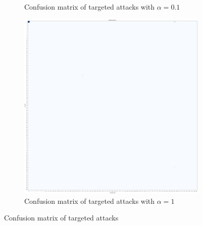 \begin{figure}[t]
\begin{subfigure}[b]{0.3\textwidth}
        \caption{Confusion matrix of targeted attacks with $\alpha = 0.1$}
        \label{fig:conf_mat_cnn}
    \end{subfigure}
    \quad
    \begin{subfigure}[b]{0.3\textwidth}
        \includegraphics[width=\textwidth]{./fig/conf_mat_cnn_knn_spk0.png}
        \caption{Confusion matrix of targeted attacks with $\alpha = 1$}
        \label{fig:conf_mat_cnn_spk0}
    \end{subfigure}
    \caption{Confusion matrix of targeted attacks}
    \label{fig:confusion_matrices}
\end{figure}
